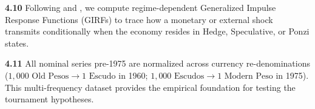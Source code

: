 \textbf{4.10} Following \citet{Koop1996} and \citet{ClavijoCortesKappesRochon2025}, we compute regime-dependent Generalized Impulse Response Functions (GIRFs) to trace how a monetary or external shock transmits conditionally when the economy resides in Hedge, Speculative, or Ponzi states.


\textbf{4.11} All nominal series pre-1975 are normalized across currency re-denominations ($1,000\text{ Old Pesos} \to 1\text{ Escudo}$ in 1960; $1,000\text{ Escudos} \to 1\text{ Modern Peso}$ in 1975). This multi-frequency dataset provides the empirical foundation for testing the tournament hypotheses.
